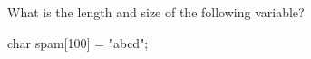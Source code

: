 What is the length and size of the following variable?

\begin{consolethree}[escapeinside=||]

char spam[100] = "ab\0cd";

\end{consolethree}

